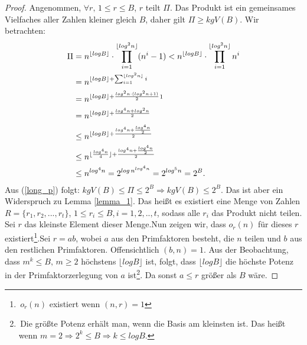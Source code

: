 \documentclass[12pt,oneside]{article}
\theoremstyle{remark}
\theoremstyle{definition}
\begin{document}
\begin{proof}
Angenommen, $\forall r, \, 1 \leq r \leq B$, $r$ teilt $\Pi$. Das Produkt ist ein gemeinsames Vielfaches aller Zahlen kleiner gleich $B$, daher gilt $\Pi \geq kgV(B)$.\newline
Wir betrachten:
\begin{equation}\label{long_p}
    \begin{split}
        \begin{aligned}
            \Pi &= n^{\lfloor log B \rfloor } \cdot \prod_{i = 1}^{\lfloor log^2 n \rfloor} (n^i - 1)
                < n^{\lfloor log B \rfloor } \cdot \prod_{i = 1}^{\lfloor log^2 n \rfloor} n^i \\
                &= n^{\lfloor log B \rfloor + \sum_{i = 1}^{\lfloor log^2 n \rfloor } i}\\ 
                &= n^{\lfloor log B \rfloor + \frac{log^2 n \cdot (log^2 n + 1)}{2}}\footnotemark \\
                &= n^{\lfloor log B \rfloor + \frac{log^4 n + log^2 n}{2}}\\
                & \leq n^{\lfloor log B \rfloor + \frac{log^4 n + \frac{log^4 n}{2}}{2}}\\
                & \leq n^{\lfloor \frac{log^4 n}{4} \rfloor + \frac{log^4 n + \frac{log^4 n}{2}}{2}}\\
                &\leq n^{log^4 n} = 2^{log \, n^{log^4 n}} = 2^{log^5 n} = 2^{B}.
        \end{aligned}
    \end{split}
\end{equation}
Aus (\ref{long_p}) folgt: $kgV(B) \leq \Pi \leq 2^B \Rightarrow kgV(B) \leq 2^B$. Das ist aber ein Widerspruch zu Lemma \ref{lemma_1}. Das heißt es existiert eine Menge von Zahlen $R = \{r_{1},r_{2},...,r_{t}\}$, $ 1 \leq r_i \leq B$,$\, i = 1,2, ..,t$, sodass alle $r_{i}$ das Produkt nicht teilen. Sei $r$ das kleinste Element dieser Menge.\newline\newline Nun zeigen wir, dass $o_{r}(n)$ für dieses $r$ existiert\footnote{$ \, o_{r}(n)$ existiert wenn $(n,r) = 1$}.\newline\newline Sei $r = ab $, wobei $a$ aus den Primfaktoren besteht, die $n$ teilen und $b$ aus den restlichen Primfaktoren. Offensichtlich $(b,n) = 1$. Aus der Beobachtung, dass $m^k \leq B, \, m \geq 2$ höchstens $\lfloor log B \rfloor$ ist, folgt, dass $ \lfloor log B \rfloor$  die höchste Potenz in der Primfaktorzerlegung von $a$ ist\footnote{ $ \,$Die größte Potenz erhält man, wenn die Basis am kleinsten ist. Das heißt wenn $m = 2 \Rightarrow 2^k \leq B \Rightarrow k \leq log B $.}. Da sonst $a \leq r$ größer als $B$ wäre.\newline\newline

\end{proof}
\end{document}
